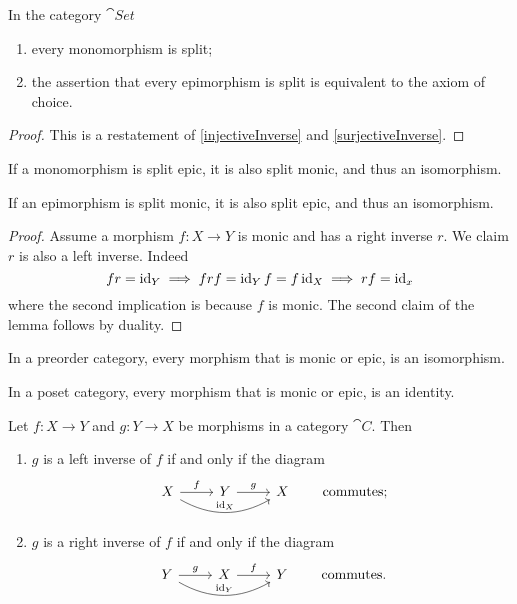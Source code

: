 \begin{lemma}
In the category $\cat{Set}$
\begin{enumerate}
\item every monomorphism is split;
\item the assertion that every epimorphism is split is equivalent to the axiom of choice.
\end{enumerate}
\end{lemma}
\begin{proof}
This is a restatement of \ref{injectiveInverse} and \ref{surjectiveInverse}.
\end{proof}

\begin{lemma} \label{singleSplitImpliesDoubleSplit}
If a monomorphism is split epic, it is also split monic, and thus an isomorphism.

If an epimorphism is split monic, it is also split epic, and thus an isomorphism.
\end{lemma}
\begin{proof}
Assume a morphism $f:X\to Y$ is monic and has a right inverse $r$. We claim $r$ is also a left inverse. Indeed
\[ fr = \operatorname{id}_Y \implies frf = \operatorname{id}_Yf = f\operatorname{id}_X \implies rf = \operatorname{id}_x  \]
where the second implication is because $f$ is monic. The second claim of the lemma follows by duality.
\end{proof}


\begin{lemma}
In a preorder category, every morphism that is monic or epic, is an isomorphism.

In a poset category, every morphism that is monic or epic, is an identity.
\end{lemma}

\begin{lemma}
Let $f:X\to Y$ and $g:Y\to X$ be morphisms in a category $\cat{C}$. Then
\begin{enumerate}
\item $g$ is a left inverse of $f$ if and only if the diagram
\[ \begin{tikzcd}
X \rar{f} \ar[rr, bend right, "\id_X"] & Y \rar{g} & X
\end{tikzcd} \qquad \text{commutes;} \]
\item $g$ is a right inverse of $f$ if and only if the diagram
\[ \begin{tikzcd}
Y \rar{g} \ar[rr, bend right, "\id_Y"] & X \rar{f} & Y
\end{tikzcd} \qquad \text{commutes.} \]
\end{enumerate}
\end{lemma}


